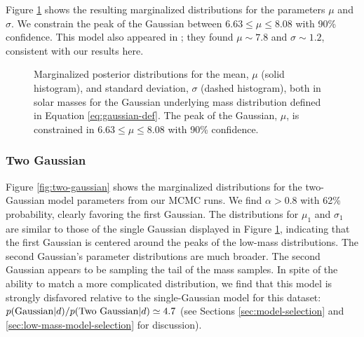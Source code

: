 \documentclass[preprint]{aastex}
\begin{document}
Figure \ref{fig:gaussian} shows the resulting marginalized
distributions for the parameters $\mu$ and $\sigma$.  We constrain the
peak of the Gaussian between $6.63 \leq \mu \leq 8.08$ with 90\%
confidence.  This model also appeared in \citet{Ozel2010}; they found
$\mu \sim 7.8$ and $\sigma \sim 1.2$, consistent with our results
here.

\begin{figure}
  \begin{center}
  \end{center}
  \caption{\label{fig:gaussian} Marginalized posterior distributions
    for the mean, $\mu$ (solid histogram), and standard deviation,
    $\sigma$ (dashed histogram), both in solar masses for the Gaussian
    underlying mass distribution defined in Equation
    \eqref{eq:gaussian-def}.  The peak of the Gaussian, $\mu$, is
    constrained in $6.63 \leq \mu \leq 8.08$ with 90\% confidence.}
\end{figure}

\subsubsection{Two Gaussian}

Figure \ref{fig:two-gaussian} shows the marginalized distributions for
the two-Gaussian model parameters from our MCMC runs.  We find $\alpha
> 0.8$ with 62\% probability, clearly favoring the first Gaussian.
The distributions for $\mu_1$ and $\sigma_1$ are similar to those of
the single Gaussian displayed in Figure \ref{fig:gaussian}, indicating
that the first Gaussian is centered around the peaks of the low-mass
distributions.  The second Gaussian's parameter distributions are much
broader.  The second Gaussian appears to be sampling the tail of the
mass samples.  In spite of the ability to match a more complicated
distribution, we find that this model is strongly disfavored relative
to the single-Gaussian model for this dataset:
$p(\textnormal{Gaussian}|d) / p(\textnormal{Two Gaussian}|d) \simeq
4.7$ (see Sections \ref{sec:model-selection} and
\ref{sec:low-mass-model-selection} for discussion).
\end{document}
